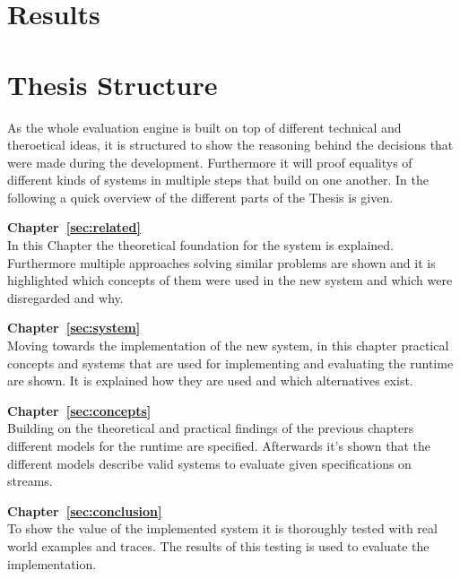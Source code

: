 \section{Results}
\label{sec:intro:results}


\section{Thesis Structure}
\label{sec:intro:structure}

As the whole evaluation engine is built on top of different technical and theroetical ideas, it is structured to show
the reasoning behind the decisions that were made during the development.
Furthermore it will proof equalitys of different kinds of systems in multiple steps that build on one another.
In the following a quick overview of the different parts of the Thesis is given.

\textbf{Chapter~\ref{sec:related}} \\[0.2em]

In this Chapter the theoretical foundation for the system is explained.
Furthermore multiple approaches solving similar problems are shown and it is highlighted which concepts of them were
used in the new system and which were disregarded and why.

\textbf{Chapter~\ref{sec:system}} \\[0.2em]

Moving towards the implementation of the new system, in this chapter practical concepts and systems that are used for implementing
and evaluating the runtime are shown.
It is explained how they are used and which alternatives exist.

\textbf{Chapter~\ref{sec:concepts}} \\[0.2em]

Building on the theoretical and practical findings of the previous chapters different models for the runtime are specified.
Afterwards it's shown that the different models describe valid systems to evaluate given specifications on streams.

\textbf{Chapter~\ref{sec:conclusion}} \\[0.2em]

To show the value of the implemented system it is thoroughly tested with real world examples and traces.
The results of this testing is used to evaluate the implementation.


